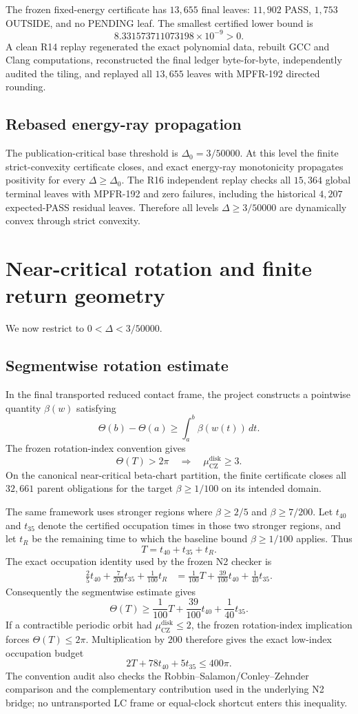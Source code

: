 \documentclass[11pt]{article}
\newcommand{\CZ}{\mu_{\mathrm{CZ}}}
\begin{document}
The frozen fixed-energy certificate has $13{,}655$ final leaves: $11{,}902$ PASS, $1{,}753$ OUTSIDE, and no PENDING leaf. The smallest certified lower bound is
\[
8.331573711073198\times 10^{-9}>0.
\]
A clean R14 replay regenerated the exact polynomial data, rebuilt GCC and Clang computations, reconstructed the final ledger byte-for-byte, independently audited the tiling, and replayed all $13{,}655$ leaves with MPFR-192 directed rounding.

\subsection{Rebased energy-ray propagation}
The publication-critical base threshold is $\Delta_0=3/50000$. At this level the finite strict-convexity certificate closes, and exact energy-ray monotonicity propagates positivity for every $\Delta\ge\Delta_0$. The R16 independent replay checks all $15{,}364$ global terminal leaves with MPFR-192 and zero failures, including the historical $4{,}207$ expected-PASS residual leaves. Therefore all levels $\Delta\ge3/50000$ are dynamically convex through strict convexity.

\section{Near-critical rotation and finite return geometry}
We now restrict to $0<\Delta<3/50000$.

\subsection{Segmentwise rotation estimate}
In the final transported reduced contact frame, the project constructs a pointwise quantity $\beta(w)$ satisfying
\[
\Theta(b)-\Theta(a)\ge \int_a^b \beta(w(t))\,dt.
\]
The frozen rotation-index convention gives
\[
\Theta(T)>2\pi \quad\Longrightarrow\quad \CZ^{\mathrm{disk}}\ge3.
\]
On the canonical near-critical beta-chart partition, the finite certificate closes all $32{,}661$ parent obligations for the target $\beta\ge1/100$ on its intended domain.

The same framework uses stronger regions where $\beta\ge2/5$ and $\beta\ge7/200$. Let $t_{40}$ and $t_{35}$ denote the certified occupation times in those two stronger regions, and let $t_R$ be the remaining time to which the baseline bound $\beta\ge1/100$ applies. Thus
\[
T=t_{40}+t_{35}+t_R.
\]
The exact occupation identity used by the frozen N2 checker is
\begin{align*}
\frac25 t_{40}+\frac7{200}t_{35}+\frac1{100}t_R
&=\frac1{100}T+\frac{39}{100}t_{40}+\frac1{40}t_{35}.
\end{align*}
Consequently the segmentwise estimate gives
\[
\Theta(T)\ge \frac1{100}T+\frac{39}{100}t_{40}+\frac1{40}t_{35}.
\]
If a contractible periodic orbit had $\CZ^{\mathrm{disk}}\le2$, the frozen rotation-index implication forces $\Theta(T)\le2\pi$. Multiplication by $200$ therefore gives the exact low-index occupation budget
\[
2T+78t_{40}+5t_{35}\le400\pi.
\]
The convention audit also checks the Robbin--Salamon/Conley--Zehnder comparison and the complementary contribution used in the underlying N2 bridge; no untransported LC frame or equal-clock shortcut enters this inequality.
\end{document}
